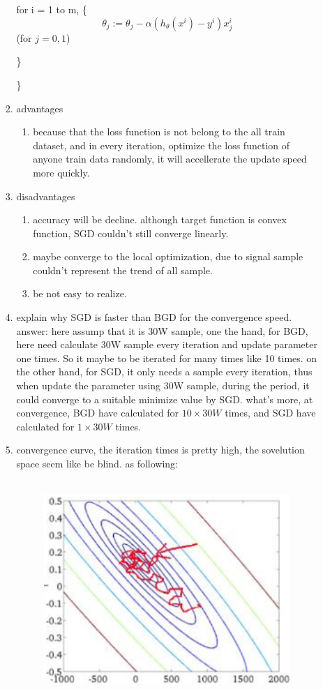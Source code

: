 \documentclass[12pt]{ctexart}%
\begin{document}
\begin{itemize}
\begin{enumerate}[(1)]
\begin{enumerate}
						\qquad for i = 1 to m, \{
								$$\theta_j := \theta_j - \alpha(h_\theta(x^i) - y^i)x_j^i$$
								\qquad \qquad \qquad(for $j = 0,1$)
								
						\qquad \}
						
						\}
						\item advantages
							\begin{enumerate}
								\item because that the loss function is not belong to the all train dataset, and in every iteration, optimize the loss function of anyone train data randomly,  it will accellerate the update speed more quickly.
							\end{enumerate}
						\item disadvantages
							\begin{enumerate}
								\item accuracy will be decline. although target function is convex function, SGD couldn't still converge linearly. 
								\item maybe converge to the local optimization, due to signal sample couldn't represent the trend of all sample.
								\item be not easy to realize.
							\end{enumerate}
						\item explain why SGD is faster than BGD for the convergence speed.\\
							answer:  here assump that it is 30W sample, one the hand, for BGD, here need calculate 30W sample every iteration and update parameter one times. So it maybe to be iterated for many times like 10 times. on the other hand, for SGD, it only needs a sample every iteration, thus when update the parameter using 30W sample, during the period, it could converge to a suitable minimize value by SGD.
							what's more, at convergence, BGD have calculated for $10\times 30W$ times, and SGD have calculated for $1\times 30W$ times. 
						\item convergence curve, the iteration times is pretty high, the sovelution space seem like be blind. as following:
						\begin{figure}[H]
							\vspace{-0.2cm}  %
							\setlength{\abovecaptionskip}{-0.2cm}   %
							\centering
							\includegraphics[scale=0.4]{Stochastic_Gradient_Descent.png}

\end{figure}
\end{enumerate}
\end{enumerate}
\end{itemize}
\end{document}
